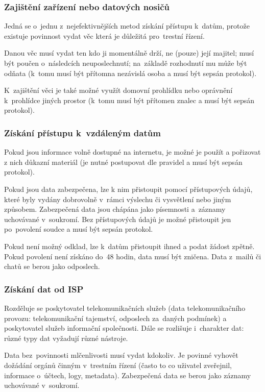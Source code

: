 \subsubsection{Zajištění zařízení nebo datových nosičů}

Jedná se o~jednu z~nejefektivnějších metod získání přístupu k~datům, protože existuje povinnost vydat věc která je důležitá pro~trestní řízení.

Danou věc musí vydat ten kdo ji momentálně drží, ne (pouze) její majitel; musí být poučen o~následcích neuposlechnutí; na~základě rozhodnutí mu může být odňata (k~tomu musí být přítomna nezávislá osoba a musí být sepsán protokol).

K~zajištění věci je také možné využít domovní prohlídku nebo oprávnění k~prohlídce jiných prostor (k~tomu musí být přítomen znalec a musí být sepsán protokol).


\subsubsection{Získání přístupu k~vzdáleným datům}

Pokud jsou informace volně dostupné na internetu, je možné je použít a pořizovat z nich důkazní materiál (je nutné postupovat dle pravidel a musí být sepsán protokol).

Pokud jsou data zabezpečena, lze k nim přistoupit pomocí přístupových údajů, které byly vydány dobrovolně v~rámci výslechu či vysvětlení nebo jiným způsobem.
Zabezpečená data jsou chápána jako písemnosti a~záznamy uchovávané v~soukromí.
Bez přístupových údajů je možné přistoupit jen po~povolení soudce a musí být sepsán protokol.

Pokud není možný odklad, lze k~datům přistoupit ihned a podat žádost zpětně.
Pokud povolení není získáno do~48 hodin, data musí být zničena.
Data z~mailů či chatů se berou jako odposlech.


\subsubsection{Získání dat od ISP}

Rozděluje se poskytovatel telekomunikačních služeb (data telekomunikačního provozu: telekomunikační tajemství, odposlech za~daných podmínek) a poskytovatel služeb informační společnosti.
Dále se rozlišuje i~charakter dat: různé typy dat vyžadují různé nástroje.

Data bez~povinnosti mlčenlivosti musí vydat kdokoliv.
Je povinné vyhovět dožádání orgánů činným v~trestním řízení (často to co uživatel zveřejnil, informace o~účtech, logy, metadata).
Zabezpečená data se berou jako záznamy uchovávané v~soukromí.

